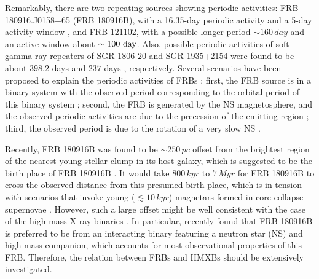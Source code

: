 \documentclass[twocolumn]{aastex62}
\begin{document}
Remarkably, there are two repeating sources showing periodic activities: FRB 180916.J0158+65 (FRB 180916B), with a 16.35-day periodic activity and a 5-day activity window \citep{Chime/Frb2020}, and FRB 121102, with a possible longer period $\sim160\,\unit{day}$ \citep{raj20, cru21} and an active window about $\sim100~{\rm day}$. Also, possible periodic activities of soft gamma-ray repeaters of SGR 1806-20 and SGR 1935+2154 were found to be about $398.2$ days \citep{zha21} and $237$ days \citep{zou21}, respectively. Several scenarios have been proposed to explain the periodic activities of FRBs  \citep[see][]{zha20}: first, the FRB source is in a binary system with the observed period corresponding to the orbital period of this binary system \citep{dai16, sma19, iok20, lyu20, dai20b, gu20, mot20, dec21, kue21, den21, wad21}; second, the FRB is generated by the NS magnetosphere, and the observed periodic activities are due to the precession of the emitting region \citep{lev20, yangh20, zan20, ton20, lidz21, sri21}; third, the observed period is due to the rotation of a very slow NS \citep{ben20,xu21}.

Recently, FRB 180916B was found to be $\sim 250\,\unit{pc}$ offset from the brightest region of the nearest young stellar clump in its host galaxy, which is suggested to be the birth place of FRB 180916B \citep{ten21}.
It would take $800\,\unit{kyr}$ to $7\,\unit{Myr}$ for FRB 180916B to cross the observed distance from this presumed birth place, which is in tension with scenarios that invoke young ($\lesssim 10\,\unit{kyr}$) magnetars formed in core collapse supernovae \citep{ten21}.
However, such a large offset might be well consistent with the case of the high mass X-ray binaries \citep[HMXBs,][] {bod12}.
In particular, \cite{Pleunis21} recently found that FRB 180916B is preferred to be from an interacting binary featuring a neutron star (NS) and high-mass companion, which accounts for most observational properties of this FRB. Therefore, the relation between FRBs and HMXBs should be extensively investigated.
\end{document}
